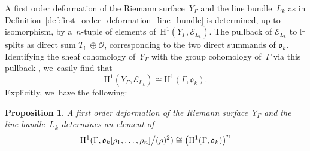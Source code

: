 \documentclass[JEP,XML,SOM,Unicode,published]{cedram}
\theoremstyle{plain}
\newtheorem{proposition}[theoremcounter]{Proposition}
\theoremstyle{definition}
\newcommand{\tx}{\text}
\newcommand{\cE}{\ensuremath{\mathcal{E}}}
\newcommand{\cO}{\ensuremath{\mathcal{O}}}
\newcommand{\frako}{\ensuremath{\mathfrak{o}}}
\newcommand{\rmH}{\ensuremath{\mathrm{H}}}
\newcommand{\HS}{\ensuremath{\mathbb{H}}}
\let\Ga\Gamma
\begin{document}
A first order deformation of the Riemann surface~$Y_\Ga$ and the line bundle~$L_k$ as in Definition~\ref{def:first_order_deformation_line_bundle} is determined, up to isomorphism, by a~$n$-tuple of elements of~$\rmH^1(Y_\Ga,\cE_{L_k})$. The pullback of $\cE_{L_k}$ to $\HS$ splits as direct sum $T_{\HS}\oplus \cO$, corresponding to the two direct summands of $\frako_k$. Identifying the sheaf cohomology of~$Y_\Ga$ with the group cohomology of~$\Ga$ via this pullback \cite{eilenberg45,szamuely2009galois}, we~easily find that
\begin{equation}\label{eq:deformation-to-cocycle}
\rmH^1(Y_\Ga,\cE_{L_k}) \cong \rmH^1(\Ga,\frako_k)
\tx{.}
\end{equation}
Explicitly, we~have the following:
\begin{proposition}
A first order deformation of the Riemann surface~$Y_\Ga$ and the line bundle~$L_k$ determines an element of
\[
\rmH^1(\Ga,\frako_k[ \rho_1,\ldots,\rho_n ] \big\slash (\rho)^2)\cong\left(\rmH^1(\Ga,\frako_k)\right)^n\]
\end{proposition}
\end{document}
